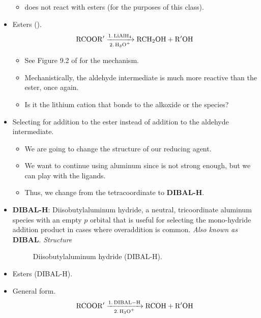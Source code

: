 \documentclass[../notes.tex]{subfiles}
\begin{document}
\begin{itemize}
    \begin{itemize}
        \item {} does not react with esters (for the purposes of this class).
    \end{itemize}
    \item Esters ().
    \begin{equation*}
        \ce{RCOOR$'$ ->[1. LiAlH4][2. H3O+] RCH2OH + R$'$OH}
    \end{equation*}
    \begin{itemize}
        \item See Figure 9.2 of \textcite{bib:CHEM22100Notes} for the mechanism.
        \item Mechanistically, the aldehyde intermediate is much more reactive than the ester, once again.
        \item Is it the lithium cation that bonds to the alkoxide or the  species?
    \end{itemize}
    \item Selecting for addition to the ester instead of addition to the aldehyde intermediate.
    \begin{itemize}
        \item We are going to change the structure of our reducing agent.
        \item We want to continue using aluminum since  is not strong enough, but we can play with the ligands.
        \item Thus, we change from the tetracoordinate  to \textbf{DIBAL-H}.
    \end{itemize}
    \item \textbf{DIBAL-H}: Diisobutylaluminum hydride, a neutral, tricoordinate aluminum species with an empty $p$ orbital that is useful for selecting the mono-hydride addition product in cases where overaddition is common. \emph{Also known as} \textbf{DIBAL}. \emph{Structure}
    \begin{figure}[h!]
        \centering
        \footnotesize
        \caption{Diisobutylaluminum hydride (DIBAL-H).}
        \label{fig:DIBAL}
    \end{figure}
    \item Esters (DIBAL-H).
    \item General form.
    \begin{equation*}
        \ce{RCOOR$'$ ->[1. DIBAL-H][2. H3O+] RCOH + R$'$OH}
    \end{equation*}

\end{itemize}
\end{document}
